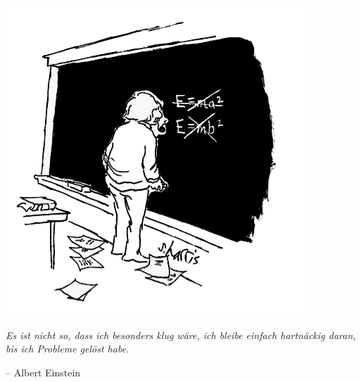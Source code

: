\documentclass[12pt]{zettel}
\begin{document}
\begin{center}
  \includegraphics[scale=0.4]{einstein}

  \emph{Es ist nicht so, dass ich besonders klug wäre, ich bleibe einfach hartnäckig daran, bis ich Probleme gelöst habe.}

  -- Albert Einstein
\end{center}
\end{document}
